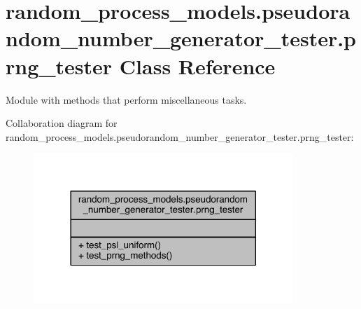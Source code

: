 \hypertarget{classrandom__process__models_1_1pseudorandom__number__generator__tester_1_1prng__tester}{}\section{random\+\_\+process\+\_\+models.\+pseudorandom\+\_\+number\+\_\+generator\+\_\+tester.\+prng\+\_\+tester Class Reference}
\label{classrandom__process__models_1_1pseudorandom__number__generator__tester_1_1prng__tester}


Module with methods that perform miscellaneous tasks.  




Collaboration diagram for random\+\_\+process\+\_\+models.\+pseudorandom\+\_\+number\+\_\+generator\+\_\+tester.\+prng\+\_\+tester\+:
\nopagebreak
\begin{figure}[H]
\begin{center}
\leavevmode
\includegraphics[width=278pt]{de/d6a/classrandom__process__models_1_1pseudorandom__number__generator__tester_1_1prng__tester__coll__graph}
\end{center}
\end{figure}
